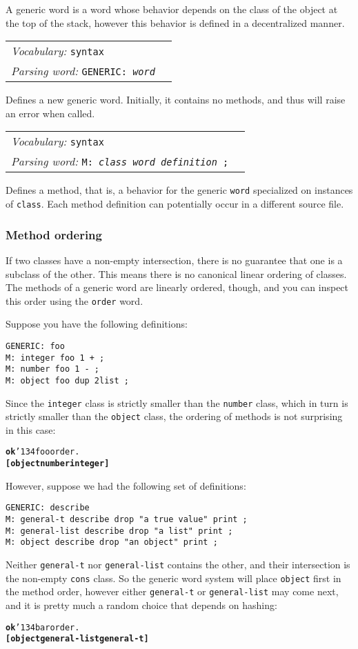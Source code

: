 \documentclass{book}
\newcommand{\bs}{\char'134}
\newcommand{\vocabulary}[1]{\emph{Vocabulary:} \texttt{#1}&\\}
\newcommand{\parsingword}[2]{\index{\texttt{#1}}\emph{Parsing word:} \texttt{#2}&\\}
\newcommand{\wordtable}[1]{

\begin{tabularx}{12cm}[t]{lX}
\hline
#1
\hline
\end{tabularx}

}
\begin{document}
A generic word is a word whose behavior depends on the class of the
object at the top of the stack, however this behavior is defined in a
decentralized manner.

\wordtable{
\vocabulary{syntax}
\parsingword{GENERIC:}{GENERIC: \emph{word}}
}
Defines a new generic word. Initially, it contains no methods, and thus will raise an error when called.

\wordtable{
\vocabulary{syntax}
\parsingword{M:}{M: \emph{class} \emph{word} \emph{definition} ;}
}
Defines a method, that is, a behavior for the generic \texttt{word} specialized on instances of \texttt{class}. Each method definition
can potentially occur in a different source file.

\subsubsection{\label{method-order}Method ordering}

If two classes have a non-empty intersection, there is no guarantee that one is a subclass of the other. This means there is no canonical linear ordering of classes. The methods of a generic word are linearly ordered, though, and you can inspect this order using the \texttt{order} word.

Suppose you have the following definitions:
\begin{verbatim}
GENERIC: foo
M: integer foo 1 + ;
M: number foo 1 - ;
M: object foo dup 2list ;
\end{verbatim}
Since the \texttt{integer} class is strictly smaller than the \texttt{number} class, which in turn is strictly smaller than the \texttt{object} class, the ordering of methods is not surprising in this case:
\begin{alltt}
\textbf{ok} \bs foo order .
\textbf{[ object number integer ]}
\end{alltt}
However, suppose we had the following set of definitions:
\begin{verbatim}
GENERIC: describe
M: general-t describe drop "a true value" print ;
M: general-list describe drop "a list" print ;
M: object describe drop "an object" print ;
\end{verbatim}
Neither \texttt{general-t} nor \texttt{general-list} contains the other, and their intersection is the non-empty \texttt{cons} class. So the generic word system will place \texttt{object} first in the method order, however either \texttt{general-t} or \texttt{general-list} may come next, and it is pretty much a random choice that depends on hashing:
\begin{alltt}
\textbf{ok} \bs bar order .
\textbf{[ object general-list general-t ]}
\end{alltt}
\end{document}
